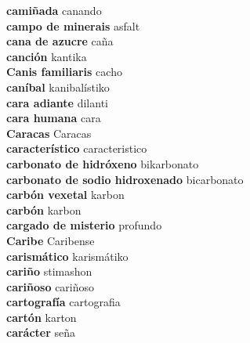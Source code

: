 \textbf{ camiñada  } canando \\
\textbf{ campo de minerais  } asfalt \\
\textbf{ cana de azucre  } caña \\
\textbf{ canción  } kantika \\
\textbf{ Canis familiaris  } cacho \\
\textbf{ caníbal  } kanibalístiko \\
\textbf{ cara adiante  } dilanti \\
\textbf{ cara humana  } cara \\
\textbf{ Caracas  } Caracas \\
\textbf{ característico  } caracteristico \\
\textbf{ carbonato de hidróxeno  } bikarbonato \\
\textbf{ carbonato de sodio hidroxenado  } bicarbonato \\
\textbf{ carbón vexetal  } karbon \\
\textbf{ carbón  } karbon \\
\textbf{ cargado de misterio  } profundo \\
\textbf{ Caribe  } Caribense \\
\textbf{ carismático  } karismátiko \\
\textbf{ cariño  } stimashon \\
\textbf{ cariñoso  } cariñoso \\
\textbf{ cartografía  } cartografia \\
\textbf{ cartón  } karton \\
\textbf{ carácter  } seña \\
